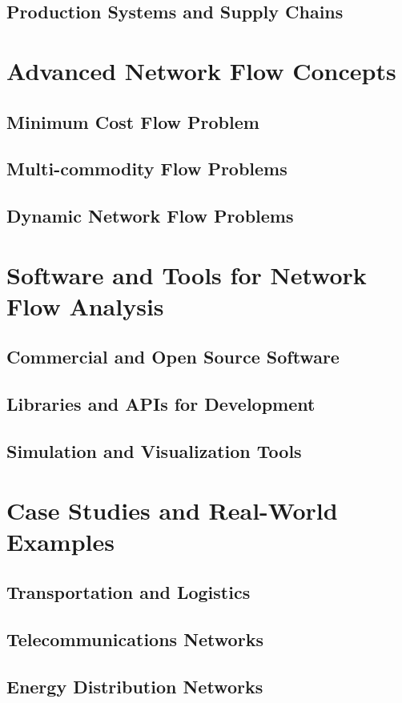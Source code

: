 \documentclass[12pt]{book} %
\begin{document}
\subsection{Production Systems and Supply Chains}

\section{Advanced Network Flow Concepts}
\subsection{Minimum Cost Flow Problem}
\subsection{Multi-commodity Flow Problems}
\subsection{Dynamic Network Flow Problems}

\section{Software and Tools for Network Flow Analysis}
\subsection{Commercial and Open Source Software}
\subsection{Libraries and APIs for Development}
\subsection{Simulation and Visualization Tools}

\section{Case Studies and Real-World Examples}
\subsection{Transportation and Logistics}
\subsection{Telecommunications Networks}
\subsection{Energy Distribution Networks}
\end{document}
